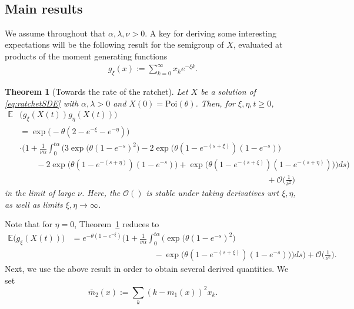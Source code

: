 \documentclass{imsart}
\theoremstyle{plain}
\newtheorem{theorem}{Theorem}[section]
\theoremstyle{definition}
\begin{document}
~

\subsection{Main results} \label{secMR}
We assume throughout that $\alpha, \lambda, \nu > 0$. A key for deriving some interesting expectations will be the following result  for the semigroup of $X$, evaluated at products of the moment generating functions
\begin{align}\label{eq:gxi}
    g_\xi(x) := \sum_{k=0}^\infty x_k e^{-\xi k}.
\end{align}

\begin{theorem}[Towards the rate of the ratchet]
  \label{T1}
  Let $X$ be a solution of \eqref{eq:ratchetSDE} with $\alpha,  \lambda > 0$ and $X(0) = \text{Poi}(\theta)$. Then, for $\xi, \eta, t \geq 0$, 
  \begin{align*}
  \mathbb E & \big( g_\xi(X(t)) g_\eta(X(t))\big) \\ & = \exp\Big( -\theta(2 - e^{-\xi} - e^{-\eta})\Big) \\ & \cdot \Big(1 +  \frac{1}{\nu \alpha} \int_0^{t \alpha} \Big(3 \exp\Big(\theta(1 - e^{-s})^2 \Big) - 2 \exp\Big(\theta(1 - e^{- (s + \xi)})(1 - e^{-s}) \Big) \\ 
  & \qquad - 2 \exp\Big(\theta(1 - e^{-(s + \eta)})(1 - e^{-s}) \Big) + \exp\Big( \theta(1 - e^{-(s + \xi)})(1 - e^{-(s + \eta)})\Big)\Big) ds\Big) \\ & \qquad \qquad \qquad \qquad \qquad \qquad \qquad \qquad \qquad \qquad \qquad \qquad \qquad \qquad \qquad + \mathcal O\Big(\frac{1}{\nu^2}\Big)
  \end{align*}
  in the limit of large $\nu$. Here, the $\mathcal O()$ is stable under taking derivatives wrt $\xi, \eta$, as well as limits $\xi, \eta \to\infty$.
\end{theorem}
Note that for $\eta=0$, Theorem~\ref{T1} reduces to
\begin{equation}
\label{eq:Ehxi}
\begin{aligned}
    \mathbb E\big( g_\xi(X(t))\big) &  = e^{-\theta(1 - e^{-\xi})} \Big(1 +  \frac 1{\nu\alpha} \int_0^{t\alpha} \Big( \exp\Big({\theta(1 - e^{-s})^2}\Big) \\ & \qquad \qquad \qquad \qquad \qquad - \exp\Big({\theta(1 - e^{-(s + \xi)})(1 - e^{-s})}\Big)\Big)ds\Big) + \mathcal O\Big(\frac{1}{\nu^2}\Big).
\end{aligned}    
\end{equation}
Next, we use the above result in order to obtain several derived quantities. We set
$$\bar m_2(x) := \sum_k (k - m_1(x))^2 x_k.$$ 
\end{document}
